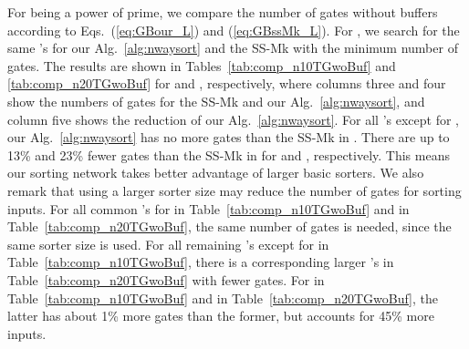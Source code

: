 \documentclass[10pt,journal,cspaper,compsoc]{IEEEtran}
\begin{document}
For  being a power of prime, we compare the number of gates without buffers according to Eqs.~(\ref{eq:GBour_L}) and (\ref{eq:GBssMk_L}).
For , we search for the same 's for our Alg.~\ref{alg:nwaysort} and the SS-Mk with the minimum number of gates. The results are shown in Tables~\ref{tab:comp_n10TGwoBuf} and \ref{tab:comp_n20TGwoBuf} for  and , respectively, where columns three and four show the numbers of gates for the SS-Mk and our Alg.~\ref{alg:nwaysort}, and column five shows the reduction of our Alg.~\ref{alg:nwaysort}.
For all 's except for , our Alg.~\ref{alg:nwaysort} has no more gates than the SS-Mk in \cite{gao1997sloping}.
There are up to 13\% and 23\% fewer gates than the SS-Mk in \cite{gao1997sloping} for  and , respectively. This means our sorting network takes better advantage of larger basic sorters.
We also remark that using a larger sorter size  may reduce the number of gates for sorting  inputs.
For all common 's for  in Table~\ref{tab:comp_n10TGwoBuf} and  in Table~\ref{tab:comp_n20TGwoBuf}, the same number of gates is needed, since the same sorter size  is used.
For all remaining 's except for  in Table~\ref{tab:comp_n10TGwoBuf}, there is a  corresponding larger 's in Table~\ref{tab:comp_n20TGwoBuf} with fewer gates.
For  in Table~\ref{tab:comp_n10TGwoBuf} and  in Table~\ref{tab:comp_n20TGwoBuf}, the latter has about 1\% more gates than the former, but accounts for 45\% more inputs.
\end{document}
